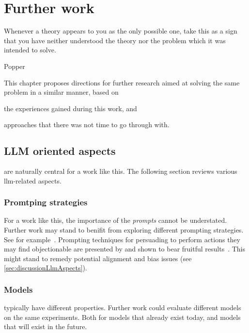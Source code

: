 \chapter{Further work}\label{chp:furtherWork}

\epigraph{Whenever a theory appears to you as the only possible one, take this as a sign that you have neither understood the theory nor the problem which it was intended to solve.}{Popper}

This chapter proposes directions for further research aimed at solving the same problem in a similar
manner, based on \begin{inparaenum}
    \item the experiences gained during this work, and
    \item approaches that there was not time to go through with.
\end{inparaenum}

\section{LLM oriented aspects}\label{sec:fwLlm}

 are naturally central for a work like this. The following
section reviews various \acrshort{llm}-related aspects.

\subsection{Promtping strategies}

For a work like this, the importance of the \emph{prompts} cannot be understated. Further work may
stand to benifit from exploring different prompting strategies. See for
example~\cite{girayPromptEngineering23}. Prompting techniques for persuading  to
perform actions they may find objectionable are presented by \citeauthor{meincke2025overtale} and
shown to bear fruitful results~\cite[1]{meincke2025overtale}. This might stand to remedy potential
alignment and bias issues (see \cref{sec:discussionLlmAspects}).

\subsection{Models}

 typically have different properties. Further work could evaluate different models
on the same experiments. Both for models that already exist today, and models that will exist in the future.

